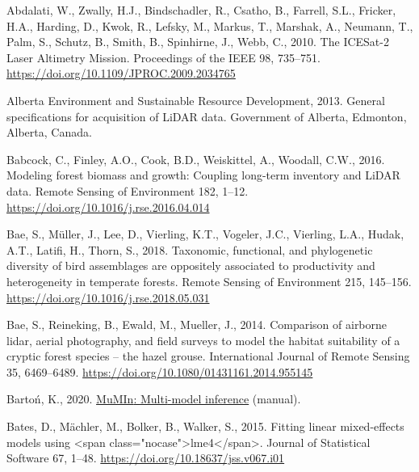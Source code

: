 \documentclass[
]{article}
\newlength{\cslhangindent}
\newlength{\cslentryspacingunit} %
\newenvironment{CSLReferences}[2] %
 {%
  \setlength{\parindent}{0pt}
  \ifodd #1
  \let\oldpar\par
  \def\par{\hangindent=\cslhangindent\oldpar}
  \fi
  \setlength{\parskip}{#2\cslentryspacingunit}
 }%
 {}
\begin{document}
\hypertarget{refs}{}
\begin{CSLReferences}{1}{0}
\leavevmode{}%
Abdalati, W., Zwally, H.J., Bindschadler, R., Csatho, B., Farrell, S.L., Fricker, H.A., Harding, D., Kwok, R., Lefsky, M., Markus, T., Marshak, A., Neumann, T., Palm, S., Schutz, B., Smith, B., Spinhirne, J., Webb, C., 2010. The {ICESat}-2 {Laser} {Altimetry} {Mission}. Proceedings of the IEEE 98, 735--751. \url{https://doi.org/10.1109/JPROC.2009.2034765}

\leavevmode{}%
Alberta Environment and Sustainable Resource Development, 2013. General specifications for acquisition of {LiDAR} data. Government of Alberta, Edmonton, Alberta, Canada.

\leavevmode{}%
Babcock, C., Finley, A.O., Cook, B.D., Weiskittel, A., Woodall, C.W., 2016. Modeling forest biomass and growth: {Coupling} long-term inventory and {LiDAR} data. Remote Sensing of Environment 182, 1--12. \url{https://doi.org/10.1016/j.rse.2016.04.014}

\leavevmode{}%
Bae, S., Müller, J., Lee, D., Vierling, K.T., Vogeler, J.C., Vierling, L.A., Hudak, A.T., Latifi, H., Thorn, S., 2018. Taxonomic, functional, and phylogenetic diversity of bird assemblages are oppositely associated to productivity and heterogeneity in temperate forests. Remote Sensing of Environment 215, 145--156. \url{https://doi.org/10.1016/j.rse.2018.05.031}

\leavevmode{}%
Bae, S., Reineking, B., Ewald, M., Mueller, J., 2014. Comparison of airborne lidar, aerial photography, and field surveys to model the habitat suitability of a cryptic forest species -- the hazel grouse. International Journal of Remote Sensing 35, 6469--6489. \url{https://doi.org/10.1080/01431161.2014.955145}

\leavevmode{}%
Bartoń, K., 2020. \href{https://CRAN.R-project.org/package=MuMIn}{{MuMIn}: {Multi}-model inference} (manual).

\leavevmode{}%
Bates, D., Mächler, M., Bolker, B., Walker, S., 2015. Fitting linear mixed-effects models using {\textless{}}span class="nocase"{\textgreater{}}lme4{\textless{}}/span{\textgreater{}}. Journal of Statistical Software 67, 1--48. \url{https://doi.org/10.18637/jss.v067.i01}


\end{CSLReferences}
\end{document}
